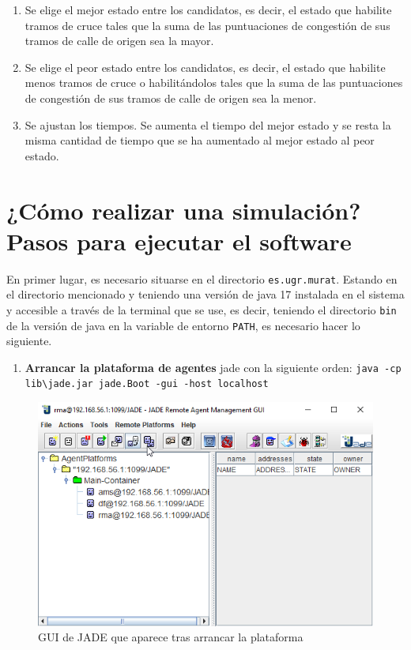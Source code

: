 \begin{enumerate}
\begin{itemize}
    \end{itemize}
    \item Se elige el mejor estado entre los candidatos, es decir, el estado que habilite tramos de cruce tales que la suma de las puntuaciones de congestión de sus tramos de calle de origen sea la mayor.
    \item Se elige el peor estado entre los candidatos, es decir, el estado que habilite menos tramos de cruce o habilitándolos tales que la suma de las puntuaciones de congestión de sus tramos de calle de origen sea la menor.
    \item Se ajustan los tiempos. Se aumenta el tiempo del mejor estado y se resta la misma cantidad de tiempo que se ha aumentado al mejor estado al peor estado.

\end{enumerate}

\newpage
\section{¿Cómo realizar una simulación? Pasos para ejecutar el software}
En primer lugar, es necesario situarse en el directorio \lstinline{es.ugr.murat}. Estando en el directorio mencionado y teniendo una versión de \Gls{java} 17 instalada en el sistema y accesible a través de la terminal que se use, es decir, teniendo el directorio \lstinline{bin} de la versión de \Gls{java} en la variable de entorno \lstinline{PATH}, es necesario hacer lo siguiente.
\begin{enumerate}
    \item \textbf{Arrancar la plataforma de agentes} \acrshort{jade} con la siguiente orden:\newline 
    \lstinline{java -cp lib\jade.jar jade.Boot -gui -host localhost}
\end{enumerate}
\begin{figure}[H]
    \centering
    \includegraphics[width=1\linewidth]{text/image/Ejec_JADEGUI.png}
    \caption{GUI de JADE que aparece tras arrancar la plataforma}
    \label{fig:ejec_jadegui}
\end{figure}

